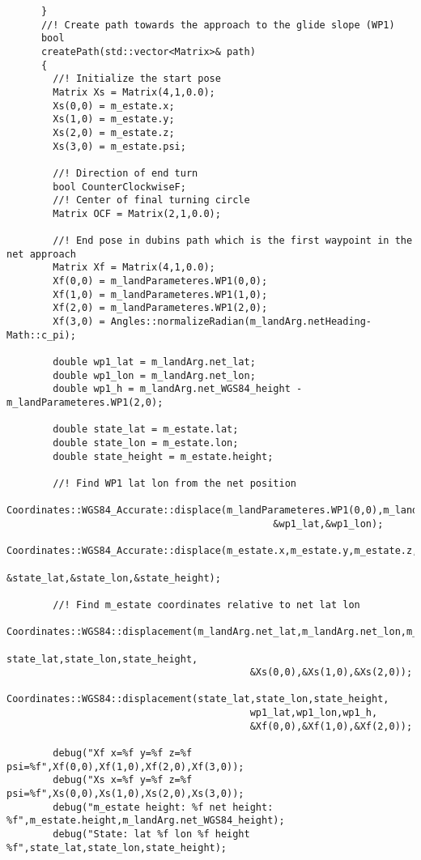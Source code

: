 \begin{frame}[fragile]
\begin{lstlisting}
      }
      //! Create path towards the approach to the glide slope (WP1)
      bool
      createPath(std::vector<Matrix>& path)
      {
        //! Initialize the start pose
        Matrix Xs = Matrix(4,1,0.0);
        Xs(0,0) = m_estate.x;
        Xs(1,0) = m_estate.y;
        Xs(2,0) = m_estate.z;
        Xs(3,0) = m_estate.psi;

        //! Direction of end turn
        bool CounterClockwiseF;
        //! Center of final turning circle
        Matrix OCF = Matrix(2,1,0.0);

        //! End pose in dubins path which is the first waypoint in the net approach
        Matrix Xf = Matrix(4,1,0.0);
        Xf(0,0) = m_landParameteres.WP1(0,0);
        Xf(1,0) = m_landParameteres.WP1(1,0);
        Xf(2,0) = m_landParameteres.WP1(2,0);
        Xf(3,0) = Angles::normalizeRadian(m_landArg.netHeading-Math::c_pi);

        double wp1_lat = m_landArg.net_lat;
        double wp1_lon = m_landArg.net_lon;
        double wp1_h = m_landArg.net_WGS84_height - m_landParameteres.WP1(2,0);

        double state_lat = m_estate.lat;
        double state_lon = m_estate.lon;
        double state_height = m_estate.height;

        //! Find WP1 lat lon from the net position
        Coordinates::WGS84_Accurate::displace(m_landParameteres.WP1(0,0),m_landParameteres.WP1(1,0),
                                              &wp1_lat,&wp1_lon);
        Coordinates::WGS84_Accurate::displace(m_estate.x,m_estate.y,m_estate.z,
                                              &state_lat,&state_lon,&state_height);

        //! Find m_estate coordinates relative to net lat lon
        Coordinates::WGS84::displacement(m_landArg.net_lat,m_landArg.net_lon,m_landArg.net_height,
                                          state_lat,state_lon,state_height,
                                          &Xs(0,0),&Xs(1,0),&Xs(2,0));
        Coordinates::WGS84::displacement(state_lat,state_lon,state_height,
                                          wp1_lat,wp1_lon,wp1_h,
                                          &Xf(0,0),&Xf(1,0),&Xf(2,0));

        debug("Xf x=%f y=%f z=%f psi=%f",Xf(0,0),Xf(1,0),Xf(2,0),Xf(3,0));
        debug("Xs x=%f y=%f z=%f psi=%f",Xs(0,0),Xs(1,0),Xs(2,0),Xs(3,0));
        debug("m_estate height: %f net height: %f",m_estate.height,m_landArg.net_WGS84_height);
        debug("State: lat %f lon %f height %f",state_lat,state_lon,state_height);


\end{lstlisting}
\end{frame}
